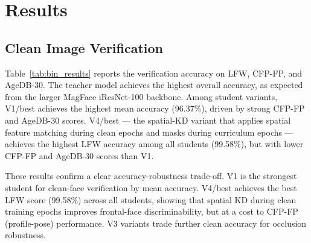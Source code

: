 \section{Results}

\subsection{Clean Image Verification}

Table~\ref{tab:bin_results} reports the verification accuracy on LFW, CFP-FP, and AgeDB-30\cite{cplfw,cfp,agedb}. The teacher model achieves the highest overall accuracy, as expected from the larger MagFace iResNet-100 backbone\cite{magface}. Among student variants, V1/best achieves the highest mean accuracy (96.37\%), driven by strong CFP-FP and AgeDB-30 scores. V4/best — the spatial-KD variant that applies spatial feature matching during clean epochs and masks during curriculum epochs — achieves the highest LFW accuracy among all students (99.58\%), but with lower CFP-FP and AgeDB-30 scores than V1.

\begin{table}[h]
\centering
\caption{Clean face verification results on LFW, CFP-FP, and AgeDB-30.}
\label{tab:bin_results}

\end{table}

These results confirm a clear accuracy-robustness trade-off. V1 is the strongest student for clean-face verification by mean accuracy. V4/best achieves the best LFW score (99.58\%) across all students, showing that spatial KD during clean training epochs improves frontal-face discriminability, but at a cost to CFP-FP (profile-pose) performance. V3 variants trade further clean accuracy for occlusion robustness.

